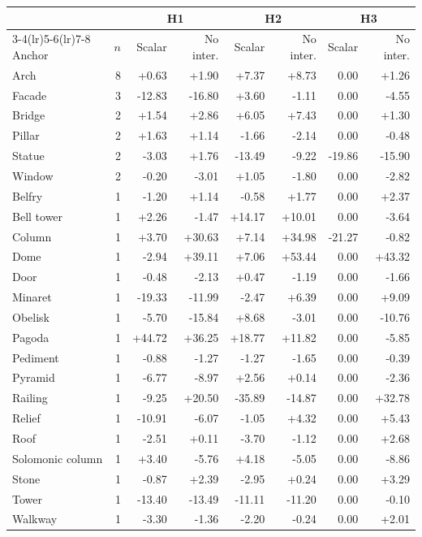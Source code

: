 \begin{tabular}{lr rrrrrr}
\toprule
& & \multicolumn{2}{c}{H1} & \multicolumn{2}{c}{H2} & \multicolumn{2}{c}{H3} \\
\cmidrule(lr){3-4}\cmidrule(lr){5-6}\cmidrule(lr){7-8}
Anchor & $n$ & Scalar & No inter. & Scalar & No inter. & Scalar & No inter. \\
\midrule
Arch & 8 & +0.63 & +1.90 & +7.37 & +8.73 & 0.00 & +1.26 \\
Facade & 3 & -12.83 & -16.80 & +3.60 & -1.11 & 0.00 & -4.55 \\
Bridge & 2 & +1.54 & +2.86 & +6.05 & +7.43 & 0.00 & +1.30 \\
Pillar & 2 & +1.63 & +1.14 & -1.66 & -2.14 & 0.00 & -0.48 \\
Statue & 2 & -3.03 & +1.76 & -13.49 & -9.22 & -19.86 & -15.90 \\
Window & 2 & -0.20 & -3.01 & +1.05 & -1.80 & 0.00 & -2.82 \\
\midrule
Belfry & 1 & -1.20 & +1.14 & -0.58 & +1.77 & 0.00 & +2.37 \\
Bell tower & 1 & +2.26 & -1.47 & +14.17 & +10.01 & 0.00 & -3.64 \\
Column & 1 & +3.70 & +30.63 & +7.14 & +34.98 & -21.27 & -0.82 \\
Dome & 1 & -2.94 & +39.11 & +7.06 & +53.44 & 0.00 & +43.32 \\
Door & 1 & -0.48 & -2.13 & +0.47 & -1.19 & 0.00 & -1.66 \\
Minaret & 1 & -19.33 & -11.99 & -2.47 & +6.39 & 0.00 & +9.09 \\
Obelisk & 1 & -5.70 & -15.84 & +8.68 & -3.01 & 0.00 & -10.76 \\
Pagoda & 1 & +44.72 & +36.25 & +18.77 & +11.82 & 0.00 & -5.85 \\
Pediment & 1 & -0.88 & -1.27 & -1.27 & -1.65 & 0.00 & -0.39 \\
Pyramid & 1 & -6.77 & -8.97 & +2.56 & +0.14 & 0.00 & -2.36 \\
Railing & 1 & -9.25 & +20.50 & -35.89 & -14.87 & 0.00 & +32.78 \\
Relief & 1 & -10.91 & -6.07 & -1.05 & +4.32 & 0.00 & +5.43 \\
Roof & 1 & -2.51 & +0.11 & -3.70 & -1.12 & 0.00 & +2.68 \\
Solomonic column & 1 & +3.40 & -5.76 & +4.18 & -5.05 & 0.00 & -8.86 \\
Stone & 1 & -0.87 & +2.39 & -2.95 & +0.24 & 0.00 & +3.29 \\
Tower & 1 & -13.40 & -13.49 & -11.11 & -11.20 & 0.00 & -0.10 \\
Walkway & 1 & -3.30 & -1.36 & -2.20 & -0.24 & 0.00 & +2.01 \\
\bottomrule
\end{tabular}
